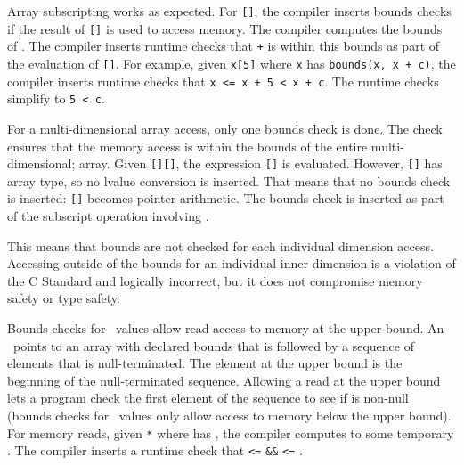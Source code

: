 Array subscripting works as expected. For \lstinline|[|\lstinline|]|, the
compiler inserts bounds checks if the result of \lstinline|[|\lstinline|]|
is used to access memory.   The compiler computes the bounds of
. The compiler inserts
runtime checks that  \lstinline|+|  is within this bounds as
part of the evaluation of \lstinline|[|\lstinline|]|. For example,
given \lstinline|x[5]| where \lstinline|x| has \lstinline|bounds(x, x + c)|, the
compiler inserts runtime checks that \lstinline|x <= x + 5 < x + c|.
The runtime checks simplify to \lstinline|5 < c|.

For a multi-dimensional array access, only one bounds check is done.
The check ensures that the memory access is within the bounds of the entire multi-dimensional;
array.  Given  \lstinline|[|\lstinline|][|\lstinline|]|, the expression
\lstinline|[|\lstinline|]| is
evaluated.  However, \lstinline|[|\lstinline|]| has array type, so no lvalue
conversion is inserted. That means that no bounds check is inserted:
\lstinline|[|\lstinline|]| becomes pointer arithmetic. The bounds check
is inserted as part of the subscript operation involving .

This means that bounds are not checked for each individual dimension access.
Accessing outside of the bounds for an
individual inner dimension is a violation of the C Standard and logically incorrect,
but it does not compromise memory safety or type safety.

Bounds checks for \ntarrayptr\ values allow read access to memory
at the upper bound.  An \ntarrayptr\ points to an array with declared bounds
that is followed by a sequence of elements that is null-terminated.
The element at the upper bound is the beginning of the null-terminated
sequence.  Allowing a read at the upper bound lets a program check the
first element of the sequence to see if is non-null
(bounds checks for \arrayptr\ values only allow access to
memory below the upper bound).  For memory reads,
given \lstinline|*| where {} has {},
the compiler computes  to some temporary .
The compiler inserts a runtime check that   \lstinline|<=| \lstinline|&&|
 \lstinline|<=| .

